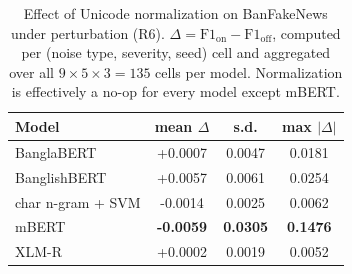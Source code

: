 \begin{table}[t]
\centering
\caption{Effect of Unicode normalization on BanFakeNews under perturbation (R6). $\Delta = \mathrm{F1}_{\text{on}} - \mathrm{F1}_{\text{off}}$, computed per (noise type, severity, seed) cell and aggregated over all $9\times5\times3=135$ cells per model. Normalization is effectively a no-op for every model except mBERT.}
\label{tab:normalizer}
\begin{tabular}{lccc}
\toprule
Model & mean $\Delta$ & s.d. & max $|\Delta|$ \\
\midrule
BanglaBERT & +0.0007 & 0.0047 & 0.0181 \\
BanglishBERT & +0.0057 & 0.0061 & 0.0254 \\
char n-gram + SVM & -0.0014 & 0.0025 & 0.0062 \\
mBERT & \textbf{-0.0059} & \textbf{0.0305} & \textbf{0.1476} \\
XLM-R & +0.0002 & 0.0019 & 0.0052 \\
\bottomrule
\end{tabular}
\end{table}
